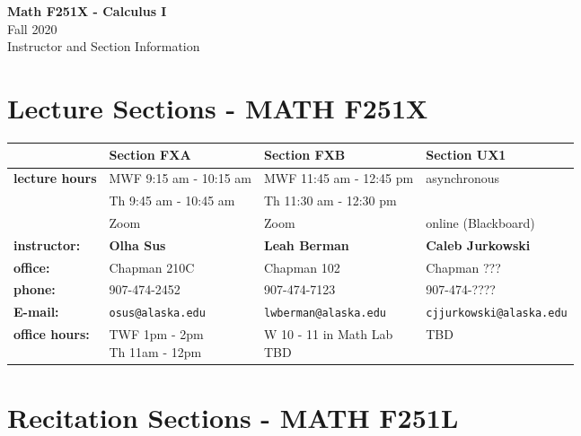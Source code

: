\documentclass[11pt,fleqn]{article}
\begin{document}
\setcounter{secnumdepth}{0}

\renewcommand\arraystretch{1.4}

\vspace*{-1in}
\begin{center}
\large{\textbf{Math F251X - Calculus I}}\\

\large{Fall 2020\\ Instructor and Section Information}
\end{center}

\vfill

\section{Lecture Sections - MATH F251X}

\begin{tabular}{| l || l | l | l |}
\hline \hline
&Section FXA&Section FXB&Section UX1\\
\hline \hline
\textbf{lecture hours}&MWF 9:15 am - 10:15 am&MWF 11:45 am - 12:45 pm& 
asynchronous\\
&Th 9:45 am - 10:45 am& Th 11:30 am - 12:30 pm & \\
&Zoom & Zoom &  online (Blackboard)\\
\hline
\textbf{instructor:}&\textbf{Olha Sus}&\textbf{Leah Berman}&\textbf{Caleb Jurkowski}\\
\hline
\textbf{office:}&Chapman 210C&Chapman 102& Chapman ???\\
\hline
\textbf{phone:}&907-474-2452&907-474-7123&907-474-????\\ 
\hline
\textbf{E-mail:}&\texttt{osus@alaska.edu} &\texttt{lwberman@alaska.edu} &\texttt{cjjurkowski@alaska.edu}\\ \hline
 \textbf{office hours:}&\parbox[c]{5 cm}{\vspace{.5\baselineskip}TWF 1pm - 2pm\\Th 11am - 12pm\vspace{.5\baselineskip}} &\parbox{5cm}{W 10 - 11 in Math Lab\\ TBD}&TBD\\ 
 \hline
\end{tabular}

\vfill

\section{Recitation Sections - MATH F251L}
\end{document}
